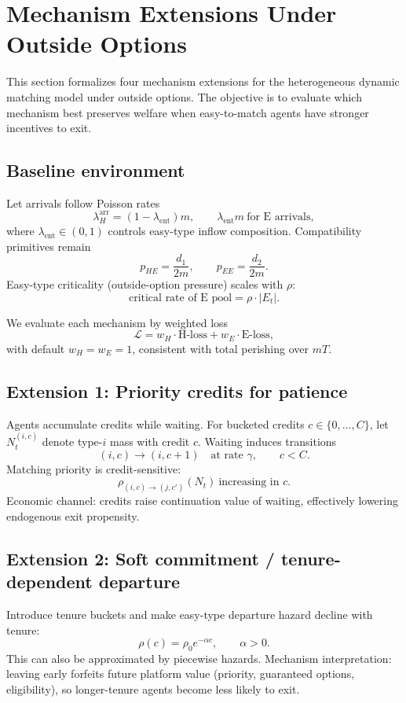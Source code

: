 \section{Mechanism Extensions Under Outside Options}
\label{sec:mechanism-extensions}

This section formalizes four mechanism extensions for the heterogeneous dynamic matching model under outside options. The objective is to evaluate which mechanism best preserves welfare when easy-to-match agents have stronger incentives to exit.

\subsection{Baseline environment}

Let arrivals follow Poisson rates
\[
\lambda_H^{\text{arr}}=(1-\lambda_{\mathrm{ent}})m,\qquad
\lambda_{\mathrm{ent}}m\ \text{for E arrivals},
\]
where \(\lambda_{\mathrm{ent}}\in(0,1)\) controls easy-type inflow composition. Compatibility primitives remain
\[
p_{HE}=\frac{d_1}{2m},\qquad p_{EE}=\frac{d_2}{2m}.
\]
Easy-type criticality (outside-option pressure) scales with \(\rho\):
\[
\text{critical rate of E pool}=\rho \cdot |E_t|.
\]

We evaluate each mechanism by weighted loss
\[
\mathcal{L}=w_H \cdot \text{H-loss} + w_E \cdot \text{E-loss},
\]
with default \(w_H=w_E=1\), consistent with total perishing over \(mT\).

\subsection{Extension 1: Priority credits for patience}

Agents accumulate credits while waiting. For bucketed credits \(c\in\{0,\ldots,C\}\), let \(N_t^{(i,c)}\) denote type-\(i\) mass with credit \(c\). Waiting induces transitions
\[
(i,c)\to(i,c+1)\quad\text{at rate }\gamma,\qquad c<C.
\]
Matching priority is credit-sensitive:
\[
\rho_{(i,c)\to(j,c')}(N_t)\ \text{increasing in } c.
\]
Economic channel: credits raise continuation value of waiting, effectively lowering endogenous exit propensity.

\subsection{Extension 2: Soft commitment / tenure-dependent departure}

Introduce tenure buckets and make easy-type departure hazard decline with tenure:
\[
\rho(c)=\rho_0 e^{-\alpha c},\qquad \alpha>0.
\]
This can also be approximated by piecewise hazards. Mechanism interpretation: leaving early forfeits future platform value (priority, guaranteed options, eligibility), so longer-tenure agents become less likely to exit.

